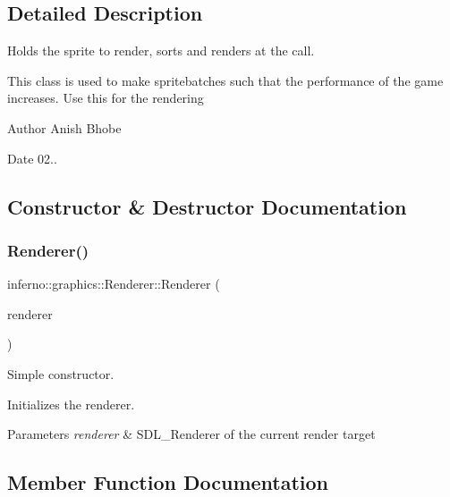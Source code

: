 \subsection{Detailed Description}
Holds the sprite to render, sorts and renders at the call. 

This class is used to make spritebatches such that the performance of the game increases. Use this for the rendering \begin{DoxyAuthor}{Author}
Anish Bhobe 
\end{DoxyAuthor}
\begin{DoxyDate}{Date}
02.. 
\end{DoxyDate}


\subsection{Constructor \& Destructor Documentation}
\mbox{\label{classinferno_1_1graphics_1_1_renderer_a78582146833f7a01fc9a11edae613d51}} 
\subsubsection{\texorpdfstring{Renderer()}{Renderer()}}
{\footnotesize\ttfamily inferno\+::graphics\+::\+Renderer\+::\+Renderer (\begin{DoxyParamCaption}\item[{S\+D\+L\+\_\+\+Renderer $\ast$}]{renderer }\end{DoxyParamCaption})\hspace{0.3cm}{\ttfamily [inline]}}



Simple constructor. 

Initializes the renderer. 
\begin{DoxyParams}{Parameters}
{\em renderer} & S\+D\+L\+\_\+\+Renderer of the current render target \\
\hline
\end{DoxyParams}


\subsection{Member Function Documentation}
\mbox{\label{classinferno_1_1graphics_1_1_renderer_a2ce12da4c416e5c3873a8cf40255c6c4}} 
